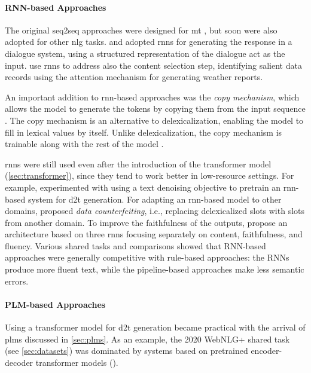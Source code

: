 {\paragraph{RNN-based Approaches} The original seq2seq approaches were designed for \ac{mt} \cite{cho2014learning,sutskever2014sequence}, but soon were also adopted for other \ac{nlg} tasks.  \citet{wen2015semantically} and \citet{dusekSequencetoSequenceGenerationSpoken2016} adopted \acp{rnn} for generating the response in a dialogue system, using a structured representation of the dialogue act as the input. \citet{mei2016talk} use \acp{rnn} to address also the content selection step, identifying salient data records using the attention mechanism for generating weather reports.

An important addition to \ac{rnn}-based approaches was the \emph{copy mechanism}, which allows the model to generate the tokens by copying them from the input sequence \cite{gu2016incorporating,seeGetPointSummarization2017}. The copy mechanism is an alternative to delexicalization, enabling the model to fill in lexical values by itself. Unlike delexicalization, the copy mechanism is trainable along with the rest of the model \cite{gehrmannEndtoEndContentPlan2018}.

\acp{rnn} were still used even after the introduction of the transformer model (\autoref{sec:transformer}), since they tend to work better in low-resource settings. For example, \citet{freitagUnsupervisedNaturalLanguage2018} experimented with using a text denoising objective to pretrain an \ac{rnn}-based system for \ac{d2t} generation. For adapting an \ac{rnn}-based model to other domains, \citet{wen2020recurrent} proposed \emph{data counterfeiting}, i.e., replacing delexicalized slots with slots from another domain. To improve the faithfulness of the outputs, \citet{rebuffel2021controlling} propose an architecture based on three \acp{rnn} focusing separately on content, faithfulness, and fluency. Various shared tasks and comparisons \cite{gardentWebNLGChallengeGenerating2017,dusekEvaluatingStateoftheartEndtoEnd2020,ferreiraNeuralDatatotextGeneration2019} showed that RNN-based approaches were generally competitive with rule-based approaches: the RNNs produce more fluent text, while the pipeline-based approaches make less semantic errors.


\paragraph{PLM-based Approaches} Using a transformer model for \ac{d2t} generation became practical with the arrival of \acp{plm} discussed in \autoref{sec:plms}. As an example, the 2020 WebNLG+ shared task (see \autoref{sec:datasets}) was dominated by systems based on pretrained encoder-decoder transformer models (\citealp{ferreira20202020}).

}
